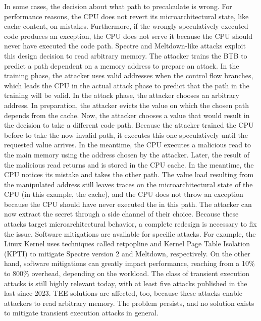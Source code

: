 In some cases, the decision about what path to precalculate is wrong. For performance reasons, the CPU does not revert
its microarchitectural state, like cache content, on mistakes. Furthermore, if the wrongly speculatively
executed code produces an exception, the CPU does not serve it because the CPU should never have executed the
code path. Spectre and Meltdown-like attacks exploit this design decision to read arbitrary memory. The attacker trains
the BTB to predict a path dependent on a memory address to prepare an attack. In the training phase, the attacker uses
valid addresses when the control flow branches, which leads the CPU in the actual attack phase to predict that the path
in the training will be valid. In the attack phase, the attacker chooses an arbitrary address. In preparation, the
attacker evicts the value on which the chosen path depends from the cache. Now, the attacker chooses a value that would
result in the decision to take a different code path. Because the attacker trained the CPU before to take the now
invalid path, it executes this one speculatively until the requested value arrives. In the meantime, the CPU executes a
malicious read to the main memory using the address chosen by the attacker. Later, the result of the malicious read
returns and is stored in the CPU cache. In the meantime, the CPU notices its mistake and takes the other path. The
value load resulting from the manipulated address still leaves traces on the microarchitectural state of the CPU (in this
example, the cache), and the CPU does not throw an exception because the CPU should have never executed the in this path.
The attacker can now extract the secret through a side channel of their choice.
Because these attacks target microarchitectural behavior, a complete redesign is necessary to
fix the issue. Software mitigations are available for specific attacks. For example, the Linux Kernel uses techniques
called retpopline and Kernel Page Table Isolation (KPTI) to mitigate Spectre version 2 and Meltdown, respectively. On
the other hand, software mitigations can greatly impact performance, reaching from a 10\% to 800\% overhead, depending
on the workload.\cite{low2018overview} The class of transient execution attacks is still highly relevant today, with at
least five attacks published in the last since 2023.
\cite{ormandy2023zenbleed,trujillo2023inception, moghimi2023downfall,ragab_ghostrace_2024, wilke2024tdxdown}
TEE solutions are affected, too, because these attacks enable attackers to read arbitrary memory. The problem
persists, and no solution exists to mitigate transient execution attacks in general.

